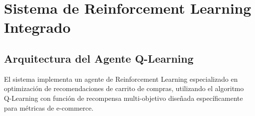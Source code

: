 
\section{Sistema de Reinforcement Learning Integrado}
\label{sec:rl}

\subsection{Arquitectura del Agente Q-Learning}
\label{subsec:agente_ql}

El sistema implementa un agente de Reinforcement Learning especializado en optimización de recomendaciones de carrito de compras, utilizando el algoritmo Q-Learning con función de recompensa multi-objetivo diseñada específicamente para métricas de e-commerce.

\vspace{0.3cm}

